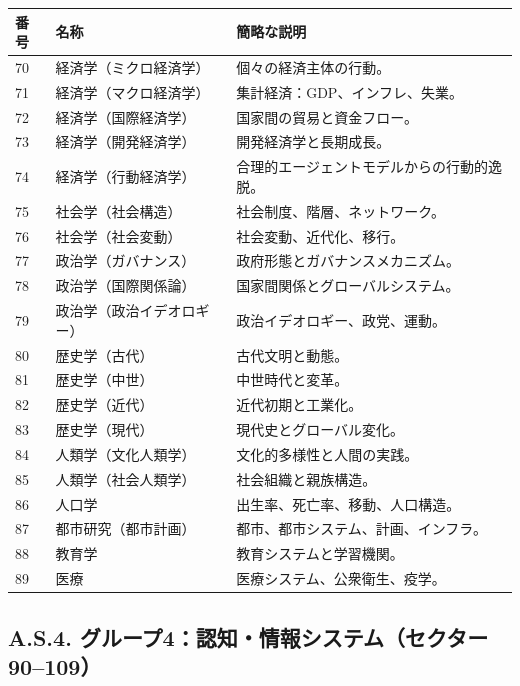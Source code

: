 \documentclass[13pt,a4paper]{ltjsarticle}
\begin{document}
	\begin{longtable}{|p{0.9cm}|p{6.0cm}|p{8.6cm}|}
		\hline
		\textbf{番号} & \textbf{名称} & \textbf{簡略な説明} \\
		\hline
		\endhead
		70 & 経済学（ミクロ経済学） & 個々の経済主体の行動。 \\
		\hline
		71 & 経済学（マクロ経済学） & 集計経済：GDP、インフレ、失業。 \\
		\hline
		72 & 経済学（国際経済学） & 国家間の貿易と資金フロー。 \\
		\hline
		73 & 経済学（開発経済学） & 開発経済学と長期成長。 \\
		\hline
		74 & 経済学（行動経済学） & 合理的エージェントモデルからの行動的逸脱。 \\
		\hline
		75 & 社会学（社会構造） & 社会制度、階層、ネットワーク。 \\
		\hline
		76 & 社会学（社会変動） & 社会変動、近代化、移行。 \\
		\hline
		77 & 政治学（ガバナンス） & 政府形態とガバナンスメカニズム。 \\
		\hline
		78 & 政治学（国際関係論） & 国家間関係とグローバルシステム。 \\
		\hline
		79 & 政治学（政治イデオロギー） & 政治イデオロギー、政党、運動。 \\
		\hline
		80 & 歴史学（古代） & 古代文明と動態。 \\
		\hline
		81 & 歴史学（中世） & 中世時代と変革。 \\
		\hline
		82 & 歴史学（近代） & 近代初期と工業化。 \\
		\hline
		83 & 歴史学（現代） & 現代史とグローバル変化。 \\
		\hline
		84 & 人類学（文化人類学） & 文化的多様性と人間の実践。 \\
		\hline
		85 & 人類学（社会人類学） & 社会組織と親族構造。 \\
		\hline
		86 & 人口学 & 出生率、死亡率、移動、人口構造。 \\
		\hline
		87 & 都市研究（都市計画） & 都市、都市システム、計画、インフラ。 \\
		\hline
		88 & 教育学 & 教育システムと学習機関。 \\
		\hline
		89 & 医療 & 医療システム、公衆衛生、疫学。 \\
		\hline
	\end{longtable}
	
	\subsection*{A.S.4. グループ4：認知・情報システム（セクター90--109）}
	
\end{document}
